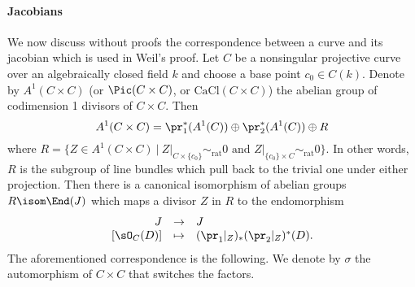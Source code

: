 \paragraph{Jacobians}
We now discuss without proofs the correspondence between a curve and its jacobian which is used in Weil's proof. Let $C$ be a nonsingular projective curve over an algebraically closed field $k$ and choose a base point $c_0 \in C(k)$. Denote by $A^1(C \times C)$ (or $\Pic (C\times C)$, or $\text{CaCl}(C\times C)$) the abelian group of codimension 1 divisors of $C\times C$. Then
$$
A^1(C\times C) = \pr_1^* (A^1(C)) \oplus  \pr_2^* (A^1(C)) \oplus R
$$  
where $R = \{ Z \in A^1(C\times C) \ | \ Z|_{C \times \{c_0\}} \sim_\text{rat} 0 \text{ and }  Z|_{\{c_0\} \times C} \sim_\text{rat} 0 \}$. In other words, $R$ is the subgroup of line bundles which pull back to the trivial one under either projection. Then there is a canonical isomorphism of abelian groups $R \isom \End(J)$ which maps a divisor $Z$ in $R$ to the endomorphism
$$
\begin{array}{rcl}
J & \to & J \\
\left[ \sO_C(D) \right] & \mapsto & (\pr_1 |_Z)_* (\pr_2 |_Z)^* (D).
\end{array}
$$
The aforementioned correspondence is the following. We denote by $\sigma $ the automorphism of $C \times C$ that switches the factors.
